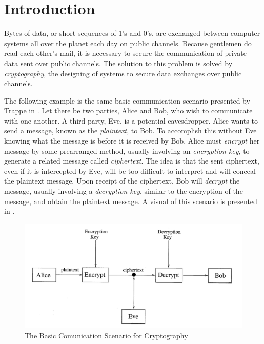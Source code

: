\section{Introduction}

\par Bytes of data, or short sequences of 1's and 0's, are exchanged between
computer systems all over the planet each day on public channels.
Because gentlemen do read each other's mail, it is necessary to secure the
communication of private data sent over public channels. The solution to this
problem is solved by {\em cryptography}, the designing of systems to secure
data exchanges over public channels.

\par The following example is the same basic communication scenario presented
by Trappe in \cite{trappe-washington_intro-to-crypto}.
Let there be two parties, Alice and Bob, who wish to communicate with one another.
A third party, Eve, is a potential eavesdropper. Alice wants to send a message,
known as the {\em plaintext}, to Bob. To accomplish this without Eve knowing
what the message is before it is received by Bob, Alice must {\em encrypt} her message
by some prearranged method, usually involving an {\em encryption key}, to generate
a related message called {\em ciphertext}. The idea is that the sent ciphertext,
even if it is intercepted by Eve, will be too difficult to interpret and will conceal the
plaintext message. Upon receipt of the ciphertext, Bob will {\em decrypt} the message,
usually involving a {\em decryption key}, similar to the encryption of the message,
and obtain the plaintext message. A visual of this scenario is presented in \cite{fig:basic-scenario}.

\begin{figure}[h!]\label{fig:basic-scenario}
	\centering
		\includegraphics[width=120mm]{figs/basic-scenario.png}
		\caption{The Basic Comunication Scenario for Cryptography \cite{trappe-washington_intro-to-crypto}}
\end{figure}

